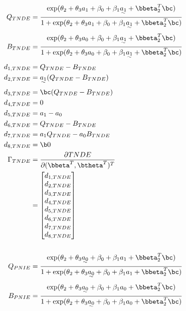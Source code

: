 \documentclass[dvipdfmx,10pt]{article}
\begin{document}
\begin{align*}
  \\
  Q_{TNDE} &= \frac
             {    \exp(\theta_{2} + \theta_{3}a_{1} + \beta_{0} + \beta_{1}\uwave{a_{1}} + \bbeta_{2}^{T}\bc)}
             {1 + \exp(\theta_{2} + \theta_{3}a_{1} + \beta_{0} + \beta_{1}\uwave{a_{1}} + \bbeta_{2}^{T}\bc)}\\
  B_{TNDE} &= \frac
             {    \exp(\theta_{2} + \theta_{3}a_{0} + \beta_{0} + \beta_{1}\uwave{a_{1}} + \bbeta_{2}^{T}\bc)}
             {1 + \exp(\theta_{2} + \theta_{3}a_{0} + \beta_{0} + \beta_{1}\uwave{a_{1}} + \bbeta_{2}^{T}\bc)}\\
      d_{1,TNDE} &= Q_{TNDE} - B_{TNDE}\\
      d_{2,TNDE} &= \uwave{a_{1}} (Q_{TNDE} - B_{TNDE})\\
      d_{3,TNDE} &= \bc (Q_{TNDE} - B_{TNDE})\\
      d_{4,TNDE} &= 0\\
      d_{5,TNDE} &= a_{1} - a_{0}\\
      d_{6,TNDE} &= Q_{TNDE} - B_{TNDE}\\
      d_{7,TNDE} &= a_{1}Q_{TNDE} - a_{0}B_{TNDE}\\
      d_{8,TNDE} &= \b0\\
  \Gamma_{TNDE}
  &= \frac{\partial TNDE}{\partial (\bbeta^{T},\btheta^{T})^{T}}\\
  &= \begin{bmatrix}
      d_{1,TNDE}\\
      d_{2,TNDE}\\
      d_{3,TNDE}\\
      d_{4,TNDE}\\
      d_{5,TNDE}\\
      d_{6,TNDE}\\
      d_{7,TNDE}\\
      d_{8,TNDE}\\
    \end{bmatrix}\\
  \\
  Q_{PNIE} &= \frac
      {    \exp(\theta_{2} + \theta_{3}\uwave{a_{0}} + \beta_{0} + \beta_{1}a_{1} + \bbeta_{2}^{T}\bc)}
      {1 + \exp(\theta_{2} + \theta_{3}\uwave{a_{0}} + \beta_{0} + \beta_{1}a_{1} + \bbeta_{2}^{T}\bc)}\\
  B_{PNIE} &= \frac
      {    \exp(\theta_{2} + \theta_{3}\uwave{a_{0}} + \beta_{0} + \beta_{1}a_{0} + \bbeta_{2}^{T}\bc)}
      {1 + \exp(\theta_{2} + \theta_{3}\uwave{a_{0}} + \beta_{0} + \beta_{1}a_{0} + \bbeta_{2}^{T}\bc)}\\

\end{align*}
\end{document}
